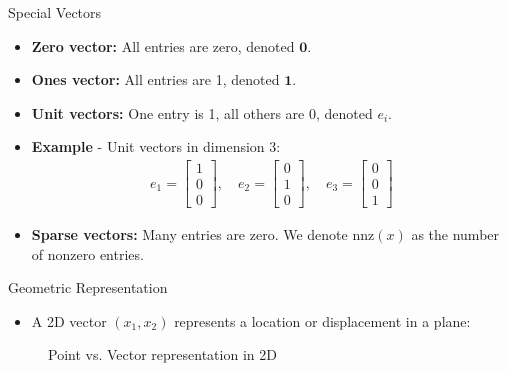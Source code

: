 \begin{frame}{Special Vectors}
    \begin{itemize}
        \item \textbf{Zero vector:} All entries are zero, denoted $\mathbf{0}$.
        \item \textbf{Ones vector:} All entries are 1, denoted $\mathbf{1}$.
        \item \textbf{Unit vectors:} One entry is 1, all others are 0, denoted $e_i$.
        \item \textbf{Example} - Unit vectors in dimension 3:
        \begin{align}
            e_1 = \begin{bmatrix} 1 \\ 0 \\ 0 \end{bmatrix}, \quad
            e_2 = \begin{bmatrix} 0 \\ 1 \\ 0 \end{bmatrix}, \quad
            e_3 = \begin{bmatrix} 0 \\ 0 \\ 1 \end{bmatrix} \label{eq:unit_vectors}
        \end{align}
        \item \textbf{Sparse vectors:} Many entries are zero. We denote $\text{nnz}(x)$ as the number of nonzero entries.
    \end{itemize}
\end{frame}

\begin{frame}{Geometric Representation}
    \begin{itemize}
        \item A 2D vector $(x_1, x_2)$ represents a location or displacement in a plane:
    \end{itemize}
    
    \begin{figure}[h]
        \centering
        \hspace{2cm}
        \caption{Point vs. Vector representation in 2D}
    \end{figure}
\end{frame}

